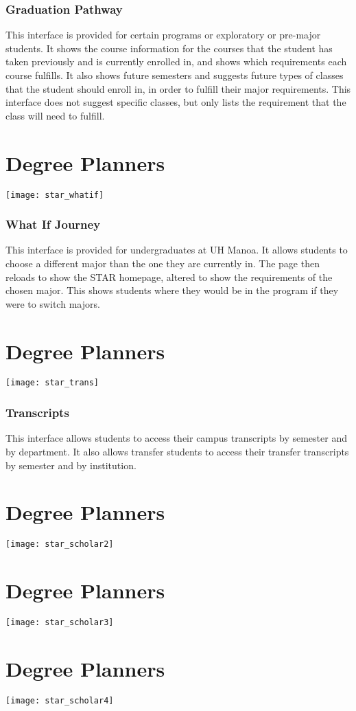 \subsubsection{Graduation Pathway}
This interface is provided for certain programs or exploratory or pre-major students. It shows the course information for the courses that the student has taken previously and is currently enrolled in, and shows which requirements each course fulfills. It also shows future semesters and suggests future types of classes that the student should enroll in, in order to fulfill their major requirements. This interface does not suggest specific classes, but only lists the requirement that the class will need to fulfill. 
\section{Degree Planners}
\texttt{[image: star\_whatif]}
\subsubsection{What If Journey}
This interface is provided for undergraduates at UH Manoa. It allows students to choose a different major than the one they are currently in. The page then reloads to show the STAR homepage, altered to show the requirements of the chosen major. This shows students where they would be in the program if they were to switch majors.
\section{Degree Planners}
\texttt{[image: star\_trans]}
\subsubsection{Transcripts}
This interface allows students to access their campus transcripts by semester and by department. It also allows transfer students to access their transfer transcripts by semester and by institution. 
\section{Degree Planners}
\texttt{[image: star\_scholar2]}
\section{Degree Planners}
\texttt{[image: star\_scholar3]}
\section{Degree Planners}
\texttt{[image: star\_scholar4]}
